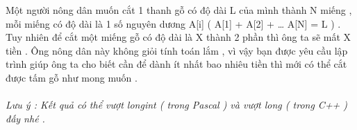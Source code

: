 Một người nông dân muốn cắt 1 thanh gỗ có độ dài L của mình thành N miếng , mỗi miếng có độ dài là 1 số nguyên dương A[i] ( A[1] + A[2] + … A[N] = L ) . Tuy nhiên để cắt một miếng gỗ có độ dài là X thành 2 phần thì ông ta sẽ mất X tiền . Ông nông dân này không giỏi tính toán lắm , vì vậy bạn được yêu cầu lập trình giúp ông ta cho biết cần để dành ít nhất bao nhiêu tiền thì mới có thể cắt được tấm gỗ như mong muốn .   
\\
\\\textit{    Lưu ý : Kết quả có thể vượt         longint        ( trong Pascal ) và vượt         long        ( trong C++ ) đấy nhé .   }

\